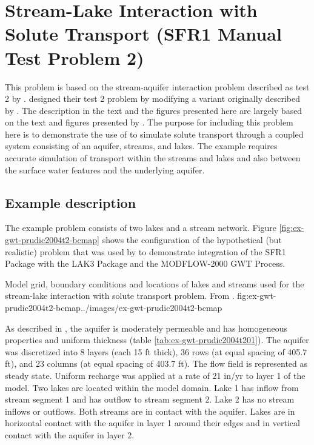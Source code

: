 \section{Stream-Lake Interaction with Solute Transport (SFR1 Manual Test Problem 2)}

This problem is based on the stream-aquifer interaction problem described as test 2 by \cite{modflowsfr1pack}.  \cite{modflowsfr1pack} designed their test 2 problem by modifying a variant originally described by \cite{modflowlak3pack}.  The description in the text and the figures presented here are largely based on the text and figures presented by \cite{modflowsfr1pack}.  The purpose for including this problem here is to demonstrate the use of \mf to simulate solute transport through a coupled system consisting of an aquifer, streams, and lakes.  The example requires accurate simulation of transport within the streams and lakes and also between the surface water features and the underlying aquifer.  

\subsection{Example description}

The example problem consists of two lakes and a stream network.  Figure \ref{fig:ex-gwt-prudic2004t2-bcmap} shows the configuration of the hypothetical (but realistic) problem that was used by \cite{modflowsfr1pack} to demonstrate integration of the SFR1 Package with the LAK3 Package and the MODFLOW-2000 GWT Process.  

\begin{StandardFigure}{
                                     Model grid, boundary conditions and locations of lakes and streams used for the stream-lake interaction with solute transport problem.  From  \cite{modflowsfr1pack}.
                                     }{fig:ex-gwt-prudic2004t2-bcmap}{../images/ex-gwt-prudic2004t2-bcmap}
\end{StandardFigure}            

As described in \cite{modflowsfr1pack}, the aquifer is moderately permeable and has homogeneous properties and uniform thickness (table \ref{tab:ex-gwt-prudic2004t201}).  The aquifer was discretized into 8 layers (each 15 ft thick), 36 rows (at equal spacing of 405.7 ft), and 23 columns (at equal spacing of 403.7 ft).  The flow field is represented as steady state.  Uniform recharge was applied at a rate of 21 in/yr to layer 1 of the model.  Two lakes are located within the model domain.  Lake 1 has inflow from stream segment 1 and has outflow to stream segment 2.  Lake 2 has no stream inflows or outflows.  Both streams are in contact with the aquifer.  Lakes are in horizontal contact with the aquifer in layer 1 around their edges and in vertical contact with the aquifer in layer 2.

